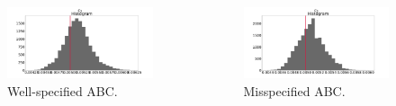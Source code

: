\documentclass{beamer}
\begin{document}
\begin{frame}
    \begin{columns}
        \begin{column}{0.45\textwidth}
            \begin{figure}
                \centering
                \includegraphics[width=\columnwidth]{images/lv_abc_g}
                \caption{Well-specified ABC.}
            \end{figure}
        \end{column}
        \begin{column}{0.45\textwidth}
            \begin{figure}
                \centering
                \includegraphics[width=\columnwidth]{images/lv_abc_c}
                \caption{Misspecified ABC.}
            \end{figure}
        \end{column}
    \end{columns}
    \end{frame}
\end{document}
